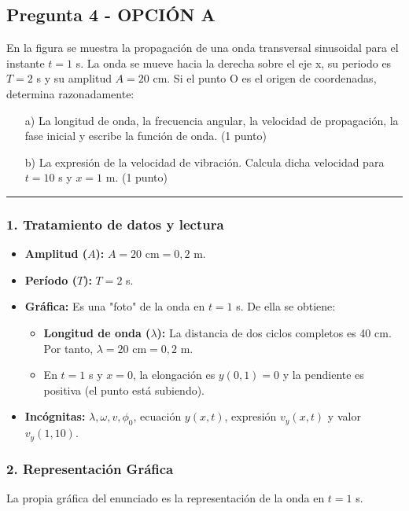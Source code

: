\subsection{Pregunta 4 - OPCIÓN A}
\label{subsec:4A_2025_jun_res}

\begin{cajaenunciado}
En la figura se muestra la propagación de una onda transversal sinusoidal para el instante $t=1$ s. La onda se mueve hacia la derecha sobre el eje x, su periodo es $T=2$ s y su amplitud $A=20$ cm. Si el punto O es el origen de coordenadas, determina razonadamente:
\begin{enumerate}
    \item[a)] La longitud de onda, la frecuencia angular, la velocidad de propagación, la fase inicial y escribe la función de onda. (1 punto)
    \item[b)] La expresión de la velocidad de vibración. Calcula dicha velocidad para $t=10$ s y $x=1$ m. (1 punto)
\end{enumerate}
\end{cajaenunciado}
\hrule

\subsubsection*{1. Tratamiento de datos y lectura}
\begin{itemize}
    \item \textbf{Amplitud ($A$):} $A=20 \text{ cm} = 0,2$ m.
    \item \textbf{Período ($T$):} $T=2$ s.
    \item \textbf{Gráfica:} Es una "foto" de la onda en $t=1$ s. De ella se obtiene:
        \begin{itemize}
            \item \textbf{Longitud de onda ($\lambda$):} La distancia de dos ciclos completos es 40 cm. Por tanto, $\lambda = 20 \text{ cm} = 0,2$ m.
            \item En $t=1$ s y $x=0$, la elongación es $y(0,1)=0$ y la pendiente es positiva (el punto está subiendo).
        \end{itemize}
    \item \textbf{Incógnitas:} $\lambda, \omega, v, \phi_0$, ecuación $y(x,t)$, expresión $v_y(x,t)$ y valor $v_y(1,10)$.
\end{itemize}

\subsubsection*{2. Representación Gráfica}
La propia gráfica del enunciado es la representación de la onda en $t=1$ s.

